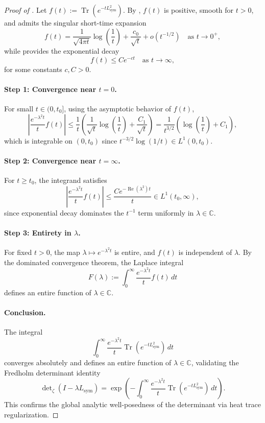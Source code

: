 \begin{proof}[Proof of ]
Let \( f(t) := \operatorname{Tr}\left(e^{-t L_{\mathrm{sym}}^2}\right) \). By , \( f(t) \) is positive, smooth for \( t > 0 \), and admits the singular short-time expansion
\[
f(t) = \frac{1}{\sqrt{4\pi t}} \log\left( \frac{1}{t} \right) + \frac{c_0}{\sqrt{t}} + o(t^{-1/2}) \quad \text{as } t \to 0^+,
\]
while  provides the exponential decay
\[
f(t) \leq C e^{-c t} \quad \text{as } t \to \infty,
\]
for some constants \( c, C > 0 \).

\paragraph{Step 1: Convergence near \( t = 0 \).}
For small \( t \in (0, t_0] \), using the asymptotic behavior of \( f(t) \),
\[
\left| \frac{e^{-\lambda^2 t}}{t} f(t) \right|
\leq \frac{1}{t} \left( \frac{1}{\sqrt{t}} \log\left( \frac{1}{t} \right) + \frac{C_1}{\sqrt{t}} \right)
= \frac{1}{t^{3/2}} \left( \log\left( \frac{1}{t} \right) + C_1 \right),
\]
which is integrable on \( (0, t_0) \) since \( t^{-3/2} \log(1/t) \in L^1(0, t_0) \).

\paragraph{Step 2: Convergence near \( t = \infty \).}
For \( t \geq t_0 \), the integrand satisfies
\[
\left| \frac{e^{-\lambda^2 t}}{t} f(t) \right| \leq \frac{C e^{-\operatorname{Re}(\lambda^2) t}}{t} \in L^1(t_0, \infty),
\]
since exponential decay dominates the \( t^{-1} \) term uniformly in \( \lambda \in \mathbb{C} \).

\paragraph{Step 3: Entirety in \( \lambda \).}
For fixed \( t > 0 \), the map \( \lambda \mapsto e^{-\lambda^2 t} \) is entire, and \( f(t) \) is independent of \( \lambda \). By the dominated convergence theorem, the Laplace integral
\[
F(\lambda) := \int_0^\infty \frac{e^{-\lambda^2 t}}{t} f(t)\, dt
\]
defines an entire function of \( \lambda \in \mathbb{C} \).

\paragraph{Conclusion.}
The integral
\[
\int_0^\infty \frac{e^{-\lambda^2 t}}{t} \operatorname{Tr}(e^{-t L_{\mathrm{sym}}^2}) \, dt
\]
converges absolutely and defines an entire function of \( \lambda \in \mathbb{C} \), validating the Fredholm determinant identity
\[
\det\nolimits_\zeta(I - \lambda L_{\mathrm{sym}}) = \exp\left( -\int_0^\infty \frac{e^{-\lambda^2 t}}{t} \operatorname{Tr}(e^{-t L_{\mathrm{sym}}^2})\, dt \right).
\]
This confirms the global analytic well-posedness of the determinant via heat trace regularization.
\end{proof}

